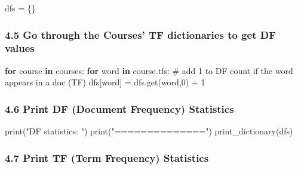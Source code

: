 \documentclass[
  letterpaper,
]{scrbook}
\newenvironment{Shaded}{\begin{snugshade}}{\end{snugshade}}
\newcommand{\BuiltInTok}[1]{\textcolor[rgb]{0.00,0.23,0.31}{#1}}
\newcommand{\CommentTok}[1]{\textcolor[rgb]{0.37,0.37,0.37}{#1}}
\newcommand{\ControlFlowTok}[1]{\textcolor[rgb]{0.00,0.23,0.31}{\textbf{#1}}}
\newcommand{\DecValTok}[1]{\textcolor[rgb]{0.68,0.00,0.00}{#1}}
\newcommand{\KeywordTok}[1]{\textcolor[rgb]{0.00,0.23,0.31}{\textbf{#1}}}
\newcommand{\NormalTok}[1]{\textcolor[rgb]{0.00,0.23,0.31}{#1}}
\newcommand{\OperatorTok}[1]{\textcolor[rgb]{0.37,0.37,0.37}{#1}}
\newcommand{\StringTok}[1]{\textcolor[rgb]{0.13,0.47,0.30}{#1}}
\begin{document}
\begin{Shaded}
\begin{Highlighting}[]
\NormalTok{dfs }\OperatorTok{=}\NormalTok{ \{\}}
\end{Highlighting}
\end{Shaded}

\subsubsection*{4.5 Go through the Courses' TF dictionaries to get DF
values}\label{go-through-the-courses-tf-dictionaries-to-get-df-values}

\begin{Shaded}
\begin{Highlighting}[]
\ControlFlowTok{for}\NormalTok{ course }\KeywordTok{in}\NormalTok{ courses: }
    \ControlFlowTok{for}\NormalTok{ word }\KeywordTok{in}\NormalTok{ course.tfs: }
        \CommentTok{\# add 1 to DF count if the word appears in a doc (TF)}
\NormalTok{        dfs[word] }\OperatorTok{=}\NormalTok{ dfs.get(word,}\DecValTok{0}\NormalTok{) }\OperatorTok{+} \DecValTok{1}
\end{Highlighting}
\end{Shaded}

\subsubsection*{4.6 Print DF (Document Frequency)
Statistics}\label{print-df-document-frequency-statistics}

\begin{Shaded}
\begin{Highlighting}[]
\BuiltInTok{print}\NormalTok{(}\StringTok{"DF statistics: "}\NormalTok{)}
\BuiltInTok{print}\NormalTok{(}\StringTok{"=============="}\NormalTok{)}
\NormalTok{print\_dictionary(dfs)}
\end{Highlighting}
\end{Shaded}

\subsubsection*{4.7 Print TF (Term Frequency)
Statistics}\label{print-tf-term-frequency-statistics}
\end{document}

